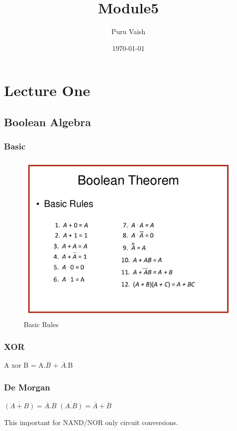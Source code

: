\documentclass[11pt, a4paper]{article}
\title{Module5}
\author{Puru Vaish}
\date{\today}
\begin{document}
\maketitle

\section{Lecture One}
\subsection{Boolean Algebra}
\subsubsection{Basic}
\begin{figure}[H]
    \centering
    \includegraphics[width =\textwidth]{Pictures/BooleanAlgebra.jpg}
    \caption{Basic Rules}
\end{figure}
\subsubsection{XOR}
A xor B = A.$\overline{B}$ + $\overline{A}$.B
\subsubsection{De Morgan}
$\overline{(A + B)}=\overline{A}.\overline{B}$\newline
$\overline{(A.B)}=\overline{A}+\overline{B}$

This important for NAND/NOR only circuit conversions.
\end{document}
